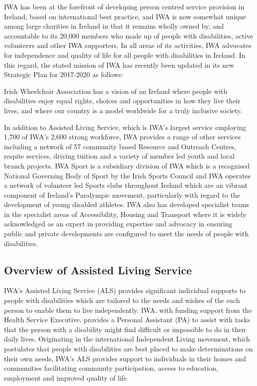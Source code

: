 \documentclass[a4paper,12pt]{article}
\begin{document}
\begin{samepage}
IWA has been at the forefront of developing person centred  service provision in Ireland, based on international best practice, and IWA is now somewhat unique among large charities in Ireland in that it remains wholly owned by, and accountable to its 20,000 members who made up of people with disabilities, active volunteers and other IWA supporters. In all areas of its activities, IWA advocates for independence and quality of life for all people with disabilities in Ireland. In this regard, the stated mission of IWA has recently been updated in its new Strategic Plan for 2017-2020 as follows:
\begin{displayquote}
Irish Wheelchair Association  has a vision of an Ireland where people with disabilities enjoy equal rights, choices and opportunities in how they live their lives, and where our country is a model worldwide for a truly inclusive society.
\end{displayquote}

In addition to Assisted Living Service, which is IWA's largest service employing 1,700 of IWA's 2,600 strong workforce, IWA provides a range of other services including a network of 57 community based Resource and Outreach Centres, respite services, driving tuition and a variety of member led youth and local branch projects. IWA Sport is a subsidiary division of IWA which is a recognised National Governing Body of Sport by the Irish Sports Council and IWA operates a network of volunteer led Sports clubs throughout Ireland which are an vibrant component of Ireland's Paralympic  movement, particularly with regard to the development of young disabled athletes.
IWA also has developed specialist teams in the specialist areas of Accessibility, Housing and Transport where it is widely acknowledged as an expert in providing expertise and advocacy in ensuring public and private developments are configured to meet the needs of people with disabilities.
\subsection {Overview of Assisted Living Service}
IWA's Assisted Living Service (ALS)  provides significant individual supports to people with disabilities which are tailored to the needs and wishes of the each person to enable them to live independently. IWA, with funding support from the Health Service Executive, provides a Personal Assistant (PA) to assist with tasks that the person with a disability might find difficult or impossible to do in their daily lives. Originating in the international Independent Living movement, which postulates that people with disabilities are best placed to make determinations on their own needs, IWA's ALS provides support to individuals in their homes and communities facilitating community participation, access to education, employment and improved quality of life. 


\end{samepage}
\end{document}
